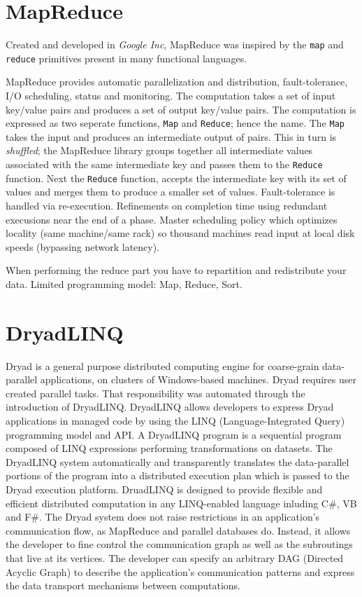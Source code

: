 \documentclass[letterpaper,twocolumn,10pt]{article}
\begin{document}
\section{MapReduce}
Created and developed in \textit{Google Inc}, MapReduce was inspired by the {\tt map} and {\tt reduce} primitives present in many functional languages.

MapReduce provides automatic parallelization and distribution, fault-tolerance, I/O scheduling, status and monitoring. The computation takes a set of input key/value pairs and produces a set of output key/value pairs. The computation is expressed as two seperate functions, {\tt Map} and {\tt Reduce}; hence the name. The {\tt Map} takes the input and produces an intermediate output of pairs. This in turn is \textit{shuffled}; the MapReduce library groups together all intermediate values associated with the same intermediate key and passes them to the {\tt Reduce} function. Next the {\tt Reduce} function, accepts the intermediate key with its set of values and merges them to produce a smaller set of values.
Fault-tolerance is handled via re-execution. Refinements on completion time using redundant execusions near the end of a phase. Master scheduling policy which optimizes locality (same machine/same rack) so thousand machines read input at local disk speeds (bypassing network latency).

When performing the reduce part you have to repartition and redistribute your data.
Limited programming model: Map, Reduce, Sort.

\section{DryadLINQ}
Dryad is a general purpose distributed computing engine for coarse-grain data-parallel applications, on clusters of Windows-based machines. 
Dryad requires user created parallel tasks. That responsibility was automated through the introduction of DryadLINQ. 
DryadLINQ allows developers to express Dryad applications in managed code by using the LINQ (Language-Integrated Query) programming model and API.
A DryadLINQ program is a sequential program composed of LINQ expressions performing transformations on datasets. The DryadLINQ system automatically and transparently translates the data-parallel portions of the program into a distributed execution plan which is passed to the Dryad execution platform. DruadLINQ is designed to provide flexible and efficient distributed computation in any LINQ-enabled language inluding C\#, VB and F\#.
The Dryad system does not raise restrictions in an application's communication flow, as MapReduce and parallel databases do. Instead, it allows the developer to fine control the communication graph as well as the subroutings that live at its vertices. The developer can specify an arbitrary DAG (Directed Acyclic Graph) to describe the application's communication patterns and express the data transport mechanisms between computations.
\end{document}
